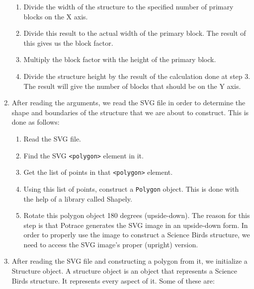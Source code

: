 \documentclass[12pt]{dalthesis}
\begin{document}
\begin{enumerate}
  \begin{enumerate}
    \item Divide the width of the structure to the specified number of primary blocks on the X axis.

    \item Divide this result to the actual width of the primary block. The result of this gives us the block factor.

    \item Multiply the block factor with the height of the primary block.

    \item Divide the structure height by the result of the calculation done at step 3. The result will give the number of blocks that should be on the Y axis.
  \end{enumerate}

  \item After reading the arguments, we read the SVG file in order to determine the shape and boundaries of the structure that we are about to construct. This is done as follows:

  \begin{enumerate}
    \item Read the SVG file.
    \item Find the SVG \lstinline{<polygon>} element in it.
    \item Get the list of points in that \lstinline{<polygon>} element.
    \item Using this list of points, construct a \lstinline{Polygon} object. This is done with the help of a library called Shapely.
    \item Rotate this polygon object 180 degrees (upside-down). The reason for this step is that Potrace generates the SVG image in an upside-down form. In order to properly use the image to construct a Science Birds structure, we need to access the SVG image's proper (upright) version.
  \end{enumerate}

  \item After reading the SVG file and constructing a polygon from it, we initialize a Structure object. A structure object is an object that represents a Science Birds structure. It represents every aspect of it. Some of these are:


\end{enumerate}
\end{document}
